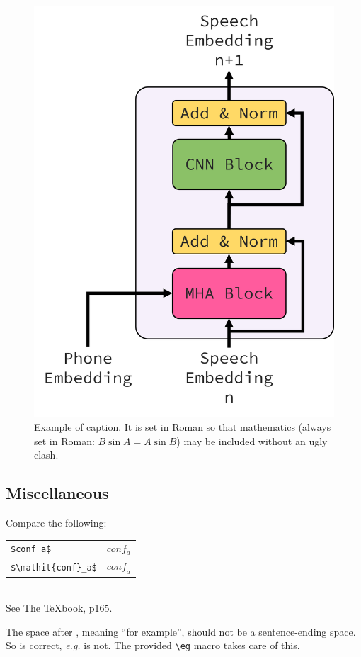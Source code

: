 \documentclass[10pt,twocolumn,letterpaper]{article}
\begin{document}
\begin{CJK}{UTF8}{bkai}
   \begin{figure}[t]
      \begin{center}
         \includegraphics[width=0.8\linewidth]{img/decoder.png}
      \end{center}
      \caption{Example of caption.  It is set in Roman so that mathematics
         (always set in Roman: $B \sin A = A \sin B$) may be included without an
         ugly clash.}
      \label{fig:long}
      \label{fig:onecol}
   \end{figure}

   \subsection{Miscellaneous}

   \noindent
   Compare the following:\\
   \begin{tabular}{ll}
      \verb'$conf_a$' & $conf_a$          \\
      \verb'$\mathit{conf}_a$' & $\mathit{conf}_a$
   \end{tabular}\\
   See The \TeX book, p165.

   The space after \eg, meaning ``for example'', should not be a
   sentence-ending space. So \eg is correct, {\em e.g.} is not.  The provided
   \verb'\eg' macro takes care of this.


\end{CJK}
\end{document}
